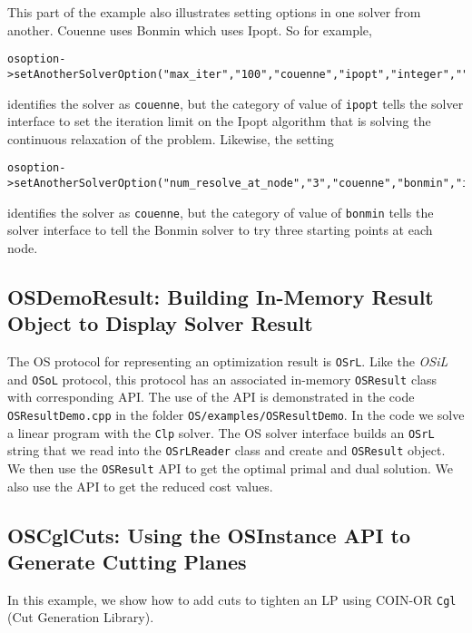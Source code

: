 \documentclass[11pt]{article}
\renewcommand{\_}{{\char"5F}}
\renewcommand{\{}{{\char"7B}}
\renewcommand{\}}{{\char"7D}}
\renewcommand{\^}{{\char"0D}}
\renewcommand{\'}{{\char"0D}}
\begin{document}
This part of the example also illustrates setting options in one solver from another. 
Couenne uses Bonmin which uses Ipopt.  So for example,

\begin{verbatim}
osoption->setAnotherSolverOption("max_iter","100","couenne","ipopt","integer","");
\end{verbatim}
identifies the solver as {\tt couenne}, but the category of value of {\tt ipopt}  tells the solver 
interface to set the iteration limit on the Ipopt algorithm that is solving the continuous relaxation 
of the problem.  Likewise, the setting
\begin{verbatim}
osoption->setAnotherSolverOption("num_resolve_at_node","3","couenne","bonmin","integer","");
\end{verbatim}
identifies the solver as {\tt couenne}, but the category of value of {\tt bonmin}  tells the solver 
interface to tell the Bonmin solver to try three starting points at each node. 

 

\subsection{OSDemoResult: Building In-Memory Result Object to Display Solver Result}\label{section:exampleOSResultDemo}

The OS protocol for representing an optimization result is {\tt OSrL}. Like the {\it OSiL} and {\tt OSoL} protocol, this protocol has an associated in-memory {\tt OSResult} class with corresponding API.  The use of the API is demonstrated in the code {\tt OSResultDemo.cpp} in the folder {\tt OS/examples/OSResultDemo}.  In the code we solve a linear program with the {\tt Clp} solver.  The OS solver interface builds an {\tt OSrL} string that we read into the {\tt OSrLReader} class and create and {\tt OSResult} object. We then use the {\tt OSResult} API to get the optimal primal and dual solution. We also use the API to get the reduced cost values. 


\subsection{OSCglCuts: Using the OSInstance API to Generate Cutting Planes}\label{section:exampleOSAddCuts}

In this example, we show how to add cuts to tighten an LP using COIN-OR  {\tt Cgl} (Cut Generation Library).
\end{document}
